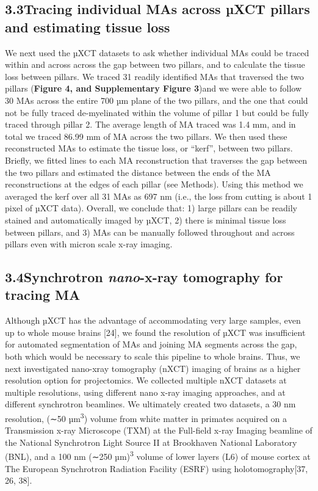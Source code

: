 \documentclass{article}
\begin{document}
\subsection*{3.3\quad Tracing individual MAs across µXCT pillars and estimating tissue loss}

We next used the µXCT datasets to ask whether individual MAs could be traced within and across across the gap between two pillars, and to calculate the tissue loss between pillars. We traced 31 readily identified MAs that traversed the two pillars (\textbf{Figure 4, and Supplementary Figure 3})and we were able to follow 30 MAs across the entire 700 µm plane of the two pillars, and the one that could not be fully traced de-myelinated within the volume of pillar 1 but could be fully traced through pillar 2. The average length of MA traced was 1.4 mm, and in total we traced 86.99 mm of MA across the two pillars. We then used these reconstructed MAs to estimate the tissue loss, or “kerf”, between two pillars. Briefly, we fitted lines to each MA reconstruction that traverses the gap between the two pillars and estimated the distance between the ends of the MA reconstructions at the edges of each pillar (see Methods). Using this method we averaged the kerf over all 31 MAs as 697 nm (i.e., the loss from cutting is about 1 pixel of µXCT data). Overall, we conclude that: 1) large pillars can be readily stained and automatically imaged by µXCT, 2) there is minimal tissue loss between pillars, and 3) MAs can be manually followed throughout and across pillars even with micron scale x-ray imaging.


\subsection*{3.4\quad Synchrotron \textbf{\emph{nano}}-x-ray tomography for tracing MA}

Although µXCT has the advantage of accommodating very large samples, even up to whole mouse brains [24], we found the resolution of µXCT was insufficient for automated segmentation of MAs and joining MA segments across the gap, both which would be necessary to scale this pipeline to whole brains. Thus, we next investigated nano-xray tomography (nXCT) imaging of brains as a higher resolution option for projectomics. We collected multiple nXCT datasets at multiple resolutions, using different nano x-ray imaging approaches, and at different synchrotron beamlines. We ultimately created two datasets, a 30 nm resolution, (∼50 µm\textsuperscript{3}) volume from white matter in primates acquired on a Transmission x-ray Microscope (TXM) at the Full-field x-ray Imaging beamline of the National Synchrotron Light Source II at Brookhaven National Laboratory (BNL), and a 100 nm (∼250 µm)\textsuperscript{3} volume of lower layers (L6) of mouse cortex at The European Synchrotron Radiation Facility (ESRF) using holotomography[37, 26, 38].
\end{document}

